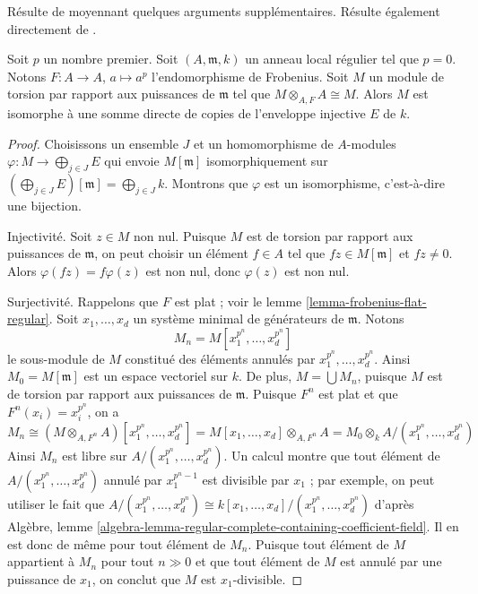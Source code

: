\begin{lemma}
\label{lemma-structure-torsion-Frobenius-regular}
\begin{reference}
Résulte de \cite[Corollary 3.6]{Huneke-Sharp} moyennant quelques arguments supplémentaires. Résulte également directement de \cite[Theorem 1.4]{Lyubeznik2}.
\end{reference}
Soit $p$ un nombre premier. Soit $(A, \mathfrak m, k)$ un anneau local régulier tel que $p = 0$. Notons $F : A \to A$, $a \mapsto a^p$ l'endomorphisme de Frobenius. Soit $M$ un module de torsion par rapport aux puissances de $\mathfrak m$ tel que $M \otimes_{A, F} A \cong M$. Alors $M$ est isomorphe à une somme directe de copies de l'enveloppe injective $E$ de $k$.
\end{lemma}

\begin{proof}
Choisissons un ensemble $J$ et un homomorphisme de $A$-modules $\varphi : M \to \bigoplus_{j \in J} E$ qui envoie $M[\mathfrak m]$ isomorphiquement sur $(\bigoplus_{j \in J} E)[\mathfrak m] = \bigoplus_{j \in J} k$. Montrons que $\varphi$ est un isomorphisme, c'est-à-dire une bijection.

\medskip\noindent
Injectivité. Soit $z \in M$ non nul. Puisque $M$ est de torsion par rapport aux puissances de $\mathfrak m$, on peut choisir un élément $f \in A$ tel que $fz \in M[\mathfrak m]$ et $fz \not = 0$. Alors $\varphi(fz) = f\varphi(z)$ est non nul, donc $\varphi(z)$ est non nul.

\medskip\noindent
Surjectivité. Rappelons que $F$ est plat ; voir le lemme \ref{lemma-frobenius-flat-regular}. Soit $x_1, \ldots, x_d$ un système minimal de générateurs de $\mathfrak m$. Notons
$$
M_n = M[x_1^{p^n}, \ldots, x_d^{p^n}]
$$
le sous-module de $M$ constitué des éléments annulés par $x_1^{p^n}, \ldots, x_d^{p^n}$. Ainsi $M_0 = M[\mathfrak m]$ est un espace vectoriel sur $k$. De plus, $M = \bigcup M_n$, puisque $M$ est de torsion par rapport aux puissances de $\mathfrak m$. Puisque $F^n$ est plat et que $F^n(x_i) = x_i^{p^n}$, on a
\begingroup\small
$$
M_n \cong (M \otimes_{A, F^n} A)[x_1^{p^n}, \ldots, x_d^{p^n}] =
M[x_1, \ldots, x_d] \otimes_{A, F^n} A =
M_0 \otimes_k A/(x_1^{p^n}, \ldots, x_d^{p^n})
$$
\endgroup
Ainsi $M_n$ est libre sur $A/(x_1^{p^n}, \ldots, x_d^{p^n})$. Un calcul montre que tout élément de $A/(x_1^{p^n}, \ldots, x_d^{p^n})$ annulé par $x_1^{p^n - 1}$ est divisible par $x_1$ ; par exemple, on peut utiliser le fait que $A/(x_1^{p^n}, \ldots, x_d^{p^n}) \cong
k[x_1, \ldots, x_d]/(x_1^{p^n}, \ldots, x_d^{p^n})$ d'après Algèbre, lemme \ref{algebra-lemma-regular-complete-containing-coefficient-field}. Il en est donc de même pour tout élément de $M_n$. Puisque tout élément de $M$ appartient à $M_n$ pour tout $n \gg 0$ et que tout élément de $M$ est annulé par une puissance de $x_1$, on conclut que $M$ est $x_1$-divisible.


\end{proof}
